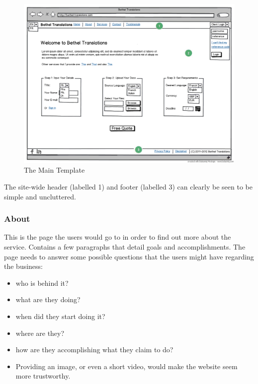 \documentclass{l3proj}
\begin{document}
\begin{figure}[ht]
\label{wireframes:main-template}
\begin{center}
\includegraphics[width=\linewidth]{wireframes/bt-homepagev3}
\caption{The Main Template}
\end{center}
\end{figure}

The site-wide header (labelled 1) and footer (labelled 3) can clearly be seen to be simple and uncluttered.


\subsubsection{About}
This is the page the users would go to in order to find out more about the
service. Contains a few paragraphs that detail goals and accomplishments.
The page needs to answer some possible questions that the users might have
regarding the business:
\begin{itemize}
	\item who is behind it?
	\item what are they doing?
	\item when did they start doing it?
	\item where are they?
	\item how are they accomplishing what they claim to do?
	\item Providing an image, or even a short video, would make the website seem
	more trustworthy.
\end{itemize}
\end{document}
